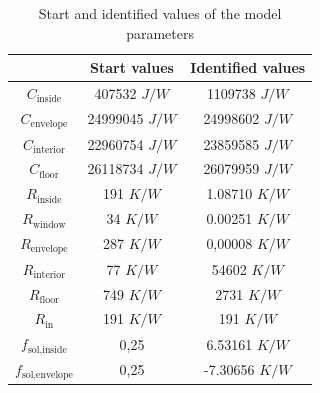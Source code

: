 \begin{table}[H]
    \centering
    \begin{tabular}{c|c|c}
         &  Start values & Identified values\\
         \hline
        $C_\text{inside}$& 407532 $J/W$ & 1109738 $J/W$\\
        $C_\text{envelope}$ & 24999045 $J/W$ & 24998602 $J/W$\\
        $C_\text{interior}$& 22960754 $J/W$ & 23859585 $J/W$\\
        $C_\text{floor}$ & 26118734 $J/W$ & 26079959 $J/W$\\
        $R_\text{inside}$ & 191 $K/W$ & 1.08710 $K/W$\\
        $R_\text{window}$ & 34 $K/W$ & 0.00251 $K/W$\\
        $R_\text{envelope}$ & 287 $K/W$ & 0,00008 $K/W$\\
        $R_\text{interior}$& 77 $K/W$ & 54602 $K/W$\\
        $R_\text{floor}$ & 749 $K/W$ & 2731 $K/W$\\
        $R_\text{in}$ & 191 $K/W$ & 191 $K/W$\\
        $f_\text{sol,inside}$ & 0,25 & 6.53161 $K/W$\\
        $f_\text{sol,envelope}$ &0,25 & -7.30656 $K/W$\\
    \end{tabular}
    \caption{Start and identified values of the model parameters}
    \label{tab:StartwerteSchätzung}
\end{table}

